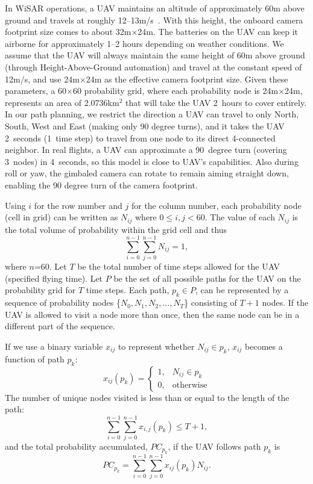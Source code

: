 \documentclass[letterpaper, 10 pt, conference]{ieeeconf}
\begin{document}
In WiSAR operations, a UAV maintains an altitude of approximately 60m above ground and travels at roughly 12--13m/s~\cite{[01UAVSpecific]FieldReport}. With this height, the onboard camera footprint size comes to about 32m$\times$24m. The batteries on the UAV can keep it airborne for approximately 1--2 hours depending on weather conditions. We assume that the UAV will always maintain the same height of 60m above ground (through Height-Above-Ground automation) and travel at the constant speed of 12m/s, and use 24m$\times$24m as the effective camera footprint size. Given these parameters, a 60$\times$60 probability grid, where each probability node is 24m$\times$24m, represents an area of 2.0736km$^2$ that will take the UAV 2~hours to cover entirely. In our path planning, we restrict the direction a UAV can travel to only North, South, West and East (making only 90 degree turns), and it takes the UAV 2~seconds (1~time step) to travel from one node to its direct 4-connected neighbor. In real flights, a UAV can approximate a 90~degree turn (covering 3~nodes) in 4~seconds, so this model is close to UAV's capabilities. Also during roll or yaw, the gimbaled camera can rotate to remain aiming straight down, enabling the 90 degree turn of the camera footprint.

Using $i$ for the row number and $j$ for the column number, each probability node (cell in grid) can be written as $N_{ij}$ where $0{\leq}i,j{<}60$. The value of each $N_{ij}$ is the total volume of probability within the grid cell and thus
\begin{equation}
\sum_{i=0}^{n-1}\sum_{j=0}^{n-1}N_{ij} = 1,
\label{totalP}
\end{equation}
where $n$=60. Let $T$ be the total number of time steps allowed for the UAV (specified flying time). Let $P$ be the set of all possible paths for the UAV on the probability grid for $T$ time steps. Each path, $p_{k} \!{\in} P$, can be represented by a sequence of probability nodes \{$N_{0},N_{1},N_{2},...,N_{T}$\} consisting of $T\!{+}1$ nodes. If the UAV is allowed to visit a node more than once, then the same node can be in a different part of the sequence.

If we use a binary variable $x_{ij}$ to represent whether $N_{ij} \!{\in} p_{k}$, $x_{ij}$ becomes a function of path $p_{k}$: 
\begin{equation}
x_{ij}(p_{k}) = 
	\left\{
	\begin{array}{cl}
		1, & N_{ij} \in p_{k} \\
		0, & \mbox{otherwise}
	\end{array}
	\right.
\label{inpath function}
\end{equation}
The number of unique nodes visited is less than or equal to the length of the path:
\begin{equation}
\sum_{i=0}^{n-1}\sum_{j=0}^{n-1}x_{i,j}(p_{k}) \leq T + 1,
\end{equation}
and the total probability accumulated, $PC_{p_{k}}$, if the UAV follows path $p_{k}$ is
\begin{equation}
PC_{p_{k}}=\sum_{i=0}^{n-1}\sum_{j=0}^{n-1}x_{ij}(p_{k})N_{ij}.
\label{pathk}
\end{equation}
\end{document}
